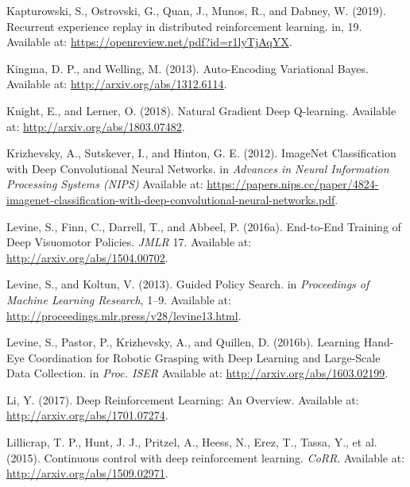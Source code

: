 \documentclass[
  letterpaper,
  DIV=11,
  numbers=noendperiod]{scrreprt}
\newlength{\cslhangindent}
\newlength{\cslentryspacingunit} %
\newenvironment{CSLReferences}[2] %
 {%
  \setlength{\parindent}{0pt}
  \ifodd #1
  \let\oldpar\par
  \def\par{\hangindent=\cslhangindent\oldpar}
  \fi
  \setlength{\parskip}{#2\cslentryspacingunit}
 }%
 {}
\begin{document}
\begin{CSLReferences}{1}{0}
\leavevmode{}%
Kapturowski, S., Ostrovski, G., Quan, J., Munos, R., and Dabney, W.
(2019). Recurrent experience replay in distributed reinforcement
learning. in, 19. Available at:
\url{https://openreview.net/pdf?id=r1lyTjAqYX}.

\leavevmode{}%
Kingma, D. P., and Welling, M. (2013). Auto-{Encoding Variational
Bayes}. Available at: \url{http://arxiv.org/abs/1312.6114}.

\leavevmode{}%
Knight, E., and Lerner, O. (2018). Natural {Gradient Deep Q-learning}.
Available at: \url{http://arxiv.org/abs/1803.07482}.

\leavevmode{}%
Krizhevsky, A., Sutskever, I., and Hinton, G. E. (2012). {ImageNet
Classification} with {Deep Convolutional Neural Networks}. in
\emph{Advances in {Neural Information Processing Systems} ({NIPS})}
Available at:
\url{https://papers.nips.cc/paper/4824-imagenet-classification-with-deep-convolutional-neural-networks.pdf}.

\leavevmode{}%
Levine, S., Finn, C., Darrell, T., and Abbeel, P. (2016a). End-to-{End
Training} of {Deep Visuomotor Policies}. \emph{JMLR} 17. Available at:
\url{http://arxiv.org/abs/1504.00702}.

\leavevmode{}%
Levine, S., and Koltun, V. (2013). Guided {Policy Search}. in
\emph{Proceedings of {Machine Learning Research}}, 1--9. Available at:
\url{http://proceedings.mlr.press/v28/levine13.html}.

\leavevmode{}%
Levine, S., Pastor, P., Krizhevsky, A., and Quillen, D. (2016b).
Learning {Hand-Eye Coordination} for {Robotic Grasping} with {Deep
Learning} and {Large-Scale Data Collection}. in \emph{Proc. {ISER}}
Available at: \url{http://arxiv.org/abs/1603.02199}.

\leavevmode{}%
Li, Y. (2017). Deep {Reinforcement Learning}: {An Overview}. Available
at: \url{http://arxiv.org/abs/1701.07274}.

\leavevmode{}%
Lillicrap, T. P., Hunt, J. J., Pritzel, A., Heess, N., Erez, T., Tassa,
Y., et al. (2015). Continuous control with deep reinforcement learning.
\emph{CoRR}. Available at: \url{http://arxiv.org/abs/1509.02971}.


\end{CSLReferences}
\end{document}
